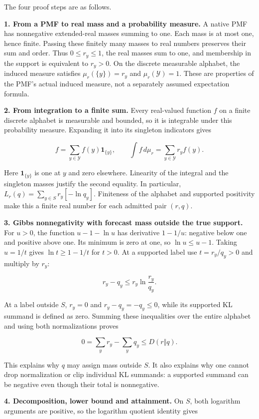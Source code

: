 \documentclass[11pt,a4paper]{article}
\begin{document}
The four proof steps are as follows.

\textbf{1. From a PMF to real mass and a probability measure.} A native PMF has nonnegative extended-real masses summing to one. Each mass is at most one, hence finite. Passing these finitely many masses to real numbers preserves their sum and order. Thus \(0\leq r_y\leq1\), the real masses sum to one, and membership in the support is equivalent to \(r_y>0\). On the discrete measurable alphabet, the induced measure satisfies \(\mu_r(\{y\})=r_y\) and \(\mu_r(\mathcal Y)=1\). These are properties of the PMF's actual induced measure, not a separately assumed expectation formula.

\textbf{2. From integration to a finite sum.} Every real-valued function \(f\) on a finite discrete alphabet is measurable and bounded, so it is integrable under this probability measure. Expanding it into its singleton indicators gives

\[
f=\sum_{y\in\mathcal Y}f(y)\mathbf 1_{\{y\}},
\qquad
\int f\,d\mu_r=\sum_{y\in\mathcal Y}r_yf(y).
\]

Here \(\mathbf 1_{\{y\}}\) is one at \(y\) and zero elsewhere. Linearity of the integral and the singleton masses justify the second equality. In particular, \(L_r(q)=\sum_{y\in S}r_y[-\ln q_y]\). Finiteness of the alphabet and supported positivity make this a finite real number for each admitted pair \((r,q)\).

\textbf{3. Gibbs nonnegativity with forecast mass outside the true support.} For \(u>0\), the function \(u-1-\ln u\) has derivative \(1-1/u\): negative below one and positive above one. Its minimum is zero at one, so \(\ln u\leq u-1\). Taking \(u=1/t\) gives \(\ln t\geq1-1/t\) for \(t>0\). At a supported label use \(t=r_y/q_y>0\) and multiply by \(r_y\):

\[
r_y-q_y\leq r_y\ln\frac{r_y}{q_y}.
\]

At a label outside \(S\), \(r_y=0\) and \(r_y-q_y=-q_y\leq0\), while its supported KL summand is defined as zero. Summing these inequalities over the entire alphabet and using both normalizations proves

\[
0=\sum_y r_y-\sum_y q_y\leq D(r\Vert q).
\]

This explains why \(q\) may assign mass outside \(S\). It also explains why one cannot drop normalization or clip individual KL summands: a supported summand can be negative even though their total is nonnegative.

\textbf{4. Decomposition, lower bound and attainment.} On \(S\), both logarithm arguments are positive, so the logarithm quotient identity gives
\end{document}
